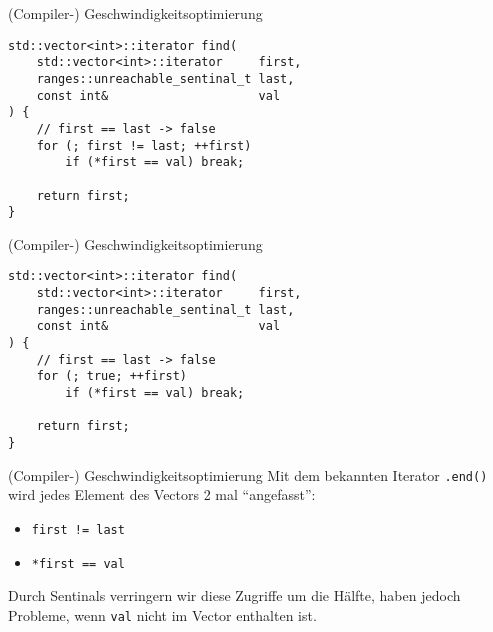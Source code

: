 \begin{frame}[fragile]{(Compiler-) Geschwindigkeitsoptimierung}
    \begin{verbatim}
std::vector<int>::iterator find(
    std::vector<int>::iterator     first,
    ranges::unreachable_sentinal_t last,
    const int&                     val
) {
    // first == last -> false
    for (; first != last; ++first)
        if (*first == val) break;
    
    return first;
}
    \end{verbatim}
\end{frame}

\begin{frame}[fragile]{(Compiler-) Geschwindigkeitsoptimierung}
    \begin{verbatim}
std::vector<int>::iterator find(
    std::vector<int>::iterator     first,
    ranges::unreachable_sentinal_t last,
    const int&                     val
) {
    // first == last -> false
    for (; true; ++first)
        if (*first == val) break;
    
    return first;
}
    \end{verbatim}
\end{frame}

\begin{frame}[fragile]{(Compiler-) Geschwindigkeitsoptimierung}
    Mit dem bekannten Iterator \texttt{.end()} wird jedes Element des Vectors 2 mal \enquote{angefasst}:
    \begin{itemize}
        \item \texttt{first != last}
        \item \texttt{*first == val}
    \end{itemize}

    \vspace{2.5em}

    Durch Sentinals verringern wir diese Zugriffe um die Hälfte, haben jedoch Probleme, wenn \texttt{val} nicht im Vector enthalten ist.
\end{frame}